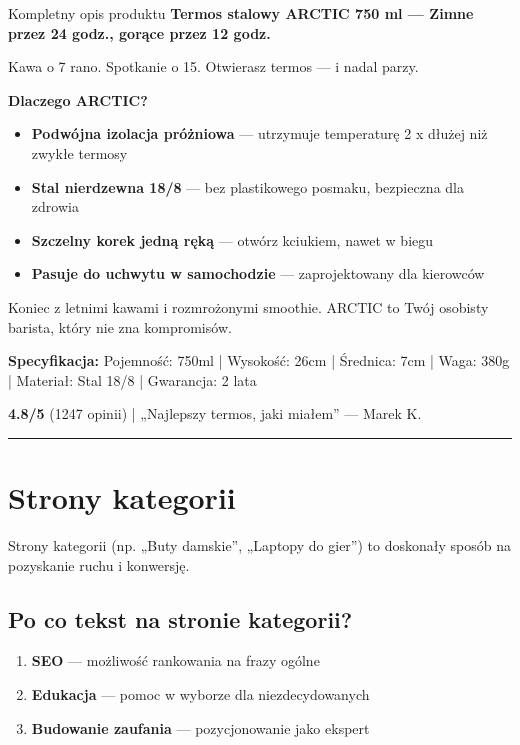 \documentclass[
  12pt,
  a4paper,
  twoside,
  openright,
  12pt,
  DIV=12,
  BCOR=12mm]{scrbook}
\providecommand{\tightlist}{%
  \setlength{\itemsep}{0pt}\setlength{\parskip}{0pt}}\usepackage{longtable,booktabs,array}
\newcommand{\decoline}{%
  \begin{center}
    \textcolor{bordergray}{\rule{0.3\textwidth}{0.5pt}}
  \end{center}
}
\begin{document}
\begin{przyklad}{Kompletny opis produktu}
\textbf{Termos stalowy ARCTIC 750 ml --- Zimne przez 24 godz., gorące przez 12 godz.}

Kawa o 7 rano. Spotkanie o 15. Otwierasz termos --- i nadal parzy.

\textbf{Dlaczego ARCTIC?}
\begin{itemize}
  \item \textbf{Podwójna izolacja próżniowa} --- utrzymuje temperaturę 2 x dłużej niż zwykłe termosy
  \item \textbf{Stal nierdzewna 18/8} --- bez plastikowego posmaku, bezpieczna dla zdrowia
  \item \textbf{Szczelny korek jedną ręką} --- otwórz kciukiem, nawet w biegu
  \item \textbf{Pasuje do uchwytu w samochodzie} --- zaprojektowany dla kierowców
\end{itemize}

Koniec z letnimi kawami i rozmrożonymi smoothie. ARCTIC to Twój osobisty barista, który nie zna kompromisów.

\textbf{Specyfikacja:}
Pojemność: 750ml | Wysokość: 26cm | Średnica: 7cm | Waga: 380g | Materiał: Stal 18/8 | Gwarancja: 2 lata

\textbf{4.8/5} (1247 opinii) | „Najlepszy termos, jaki miałem” --- Marek K.
\end{przyklad}

\decoline

\section{Strony kategorii}\label{strony-kategorii}

Strony kategorii (np. „Buty damskie'', „Laptopy do gier'') to doskonały
sposób na pozyskanie ruchu i konwersję.

\subsection{Po co tekst na stronie
kategorii?}\label{po-co-tekst-na-stronie-kategorii}

\begin{enumerate}
\def\labelenumi{\arabic{enumi}.}
\tightlist
\item
  \textbf{SEO} --- możliwość rankowania na frazy ogólne
\item
  \textbf{Edukacja} --- pomoc w wyborze dla niezdecydowanych
\item
  \textbf{Budowanie zaufania} --- pozycjonowanie jako ekspert
\end{enumerate}
\end{document}

